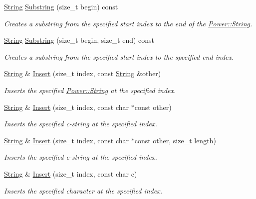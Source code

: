 \begin{DoxyCompactItemize}
\hyperlink{class_power_1_1_string}{String} \hyperlink{class_power_1_1_string_a754d4d67de005b89aba041db5f551e1c}{Substring} (size\+\_\+t begin) const
\begin{DoxyCompactList}\small\item\em Creates a substring from the specified start index to the end of the \hyperlink{class_power_1_1_string}{Power\+::\+String}. \end{DoxyCompactList}\item 
\hyperlink{class_power_1_1_string}{String} \hyperlink{class_power_1_1_string_a648cd16b1af13b87a20d623d933f067c}{Substring} (size\+\_\+t begin, size\+\_\+t end) const
\begin{DoxyCompactList}\small\item\em Creates a substring from the specified start index to the specified end index. \end{DoxyCompactList}\item 
\hyperlink{class_power_1_1_string}{String} \& \hyperlink{class_power_1_1_string_a2d92ca786aa910d06176b4107bebc285}{Insert} (size\+\_\+t index, const \hyperlink{class_power_1_1_string}{String} \&other)
\begin{DoxyCompactList}\small\item\em Inserts the specified \hyperlink{class_power_1_1_string}{Power\+::\+String} at the specified index. \end{DoxyCompactList}\item 
\hyperlink{class_power_1_1_string}{String} \& \hyperlink{class_power_1_1_string_a44a8b56904401398d11ad927699414f4}{Insert} (size\+\_\+t index, const char $\ast$const other)
\begin{DoxyCompactList}\small\item\em Inserts the specified c-\/string at the specified index. \end{DoxyCompactList}\item 
\hyperlink{class_power_1_1_string}{String} \& \hyperlink{class_power_1_1_string_a6396f902cbd4cc5f8216f3b36a3d5718}{Insert} (size\+\_\+t index, const char $\ast$const other, size\+\_\+t length)
\begin{DoxyCompactList}\small\item\em Inserts the specified c-\/string at the specified index. \end{DoxyCompactList}\item 
\hyperlink{class_power_1_1_string}{String} \& \hyperlink{class_power_1_1_string_a2a7e5bcd31c35003a35949cfd993528a}{Insert} (size\+\_\+t index, const char c)
\begin{DoxyCompactList}\small\item\em Inserts the specified character at the specified index. \end{DoxyCompactList}\item 

\end{DoxyCompactItemize}
